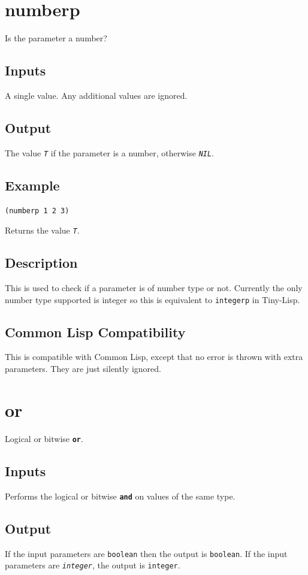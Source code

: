 \documentclass[10pt, openany]{book}
\newcommand{\operation}[1]{\textbf{\texttt{#1}}}
\newcommand{\constant}[1]{\emph{\texttt{#1}}}
\newcommand{\keyword}[1]{\texttt{#1}}
\newcommand{\datatype}[1]{\texttt{#1}}
\newcommand{\tl}{Tiny-Lisp}
\newcommand{\cl}{Common Lisp}
\begin{document}
\section{numberp}
Is the parameter a number?
\subsection{Inputs}
A single value.  Any additional values are ignored.
\subsection{Output}
The value \constant{T} if the parameter is a number, otherwise \constant{NIL}.
\subsection{Example}
\begin{lstlisting}
(numberp 1 2 3)
\end{lstlisting}
Returns the value \constant{T}.
\subsection{Description}
This is used to check if a parameter is of number type or not.  Currently the only number type supported is integer so this is equivalent to \keyword{integerp} in \tl.
\subsection{Common Lisp Compatibility}
This is compatible with \cl, except that no error is thrown with extra parameters.  They are just silently ignored.

\section{or}
Logical or bitwise \operation{or}.
\subsection{Inputs}
Performs the logical or bitwise \operation{and} on values of the same type.
\subsection{Output}
If the input parameters are \datatype{boolean} then the output is \datatype{boolean}.  If the input parameters are \constant{integer}, the output is \datatype{integer}.
\end{document}
